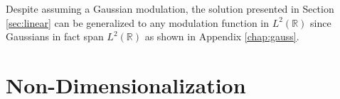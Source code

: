 Despite assuming a Gaussian modulation, the solution presented in Section \ref{sec:linear} can be generalized to any modulation function in $L^2(\mathbb{R})$ since Gaussians in fact span $L^2(\mathbb{R})$ as shown in Appendix \ref{chap:gauss}. \\

%

\section{Non-Dimensionalization}

%
%
%

